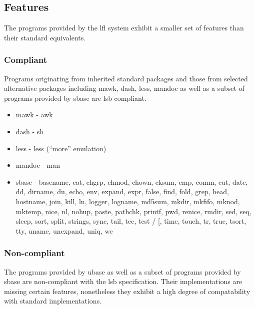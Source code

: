 \subsection{Features}\label{Features}

The programs provided by the \gls{lfl} system exhibit a smaller set of features than their standard equivalents.

\subsubsection{Compliant}

Programs originating from inherited standard packages and those from selected alternative packages including mawk, dash, less, mandoc as well as a subset of programs provided by sbase are \gls{lsb} compliant.

\begin{itemize}
    \item mawk - awk
    \item dash - sh
    \item less - less (\enquote{more} emulation)
    \item mandoc - man
    \item sbase - basename, cat, chgrp, chmod, chown, cksum, cmp, comm, cut, date, dd, dirname, du, echo, env, expand, expr, false, find, fold, grep, head, hostname, join, kill, ln, logger, logname, md5sum, mkdir, mkfifo, mknod, mktemp, nice, nl, nohup, paste, pathchk, printf, pwd, renice, rmdir, sed, seq, sleep, sort, split, strings, sync, tail, tee, test / [, time, touch, tr, true, tsort, tty, uname, unexpand, uniq, wc
\end{itemize}

\subsubsection{Non-compliant}

The programs provided by ubase as well as a subset of programs provided by sbase are non-compliant with the \gls{lsb} specification. Their implementations are missing certain features, nonetheless they exhibit a high degree of compatability with standard implementations.



